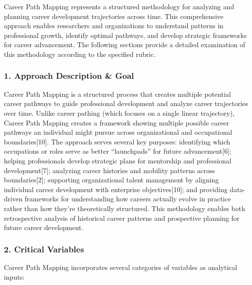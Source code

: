 \documentclass[./main.tex]{subfiles}
\begin{document}
Career Path Mapping represents a structured methodology for analyzing
and planning career development trajectories across time. This
comprehensive approach enables researchers and organizations to
understand patterns in professional growth, identify optimal pathways,
and develop strategic frameworks for career advancement. The following
sections provide a detailed examination of this methodology according to
the specified rubric.

\subsubsection{1. Approach Description \&
Goal}\label{approach-description-goal}

Career Path Mapping is a structured process that creates multiple
potential career pathways to guide professional development and analyze
career trajectories over time. Unlike career pathing (which focuses on a
single linear trajectory), Career Path Mapping creates a framework
showing multiple possible career pathways an individual might pursue
across organizational and occupational boundaries{[}10{]}. The approach
serves several key purposes: identifying which occupations or roles
serve as better ``launchpads'' for future advancement{[}6{]}; helping
professionals develop strategic plans for mentorship and professional
development{[}7{]}; analyzing career histories and mobility patterns
across boundaries{[}2{]}; supporting organizational talent management by
aligning individual career development with enterprise
objectives{[}10{]}; and providing data-driven frameworks for
understanding how careers actually evolve in practice rather than how
they're theoretically structured. This methodology enables both
retrospective analysis of historical career patterns and prospective
planning for future career development.

\subsubsection{2. Critical Variables}\label{critical-variables}

Career Path Mapping incorporates several categories of variables as
analytical inputs:
\end{document}
